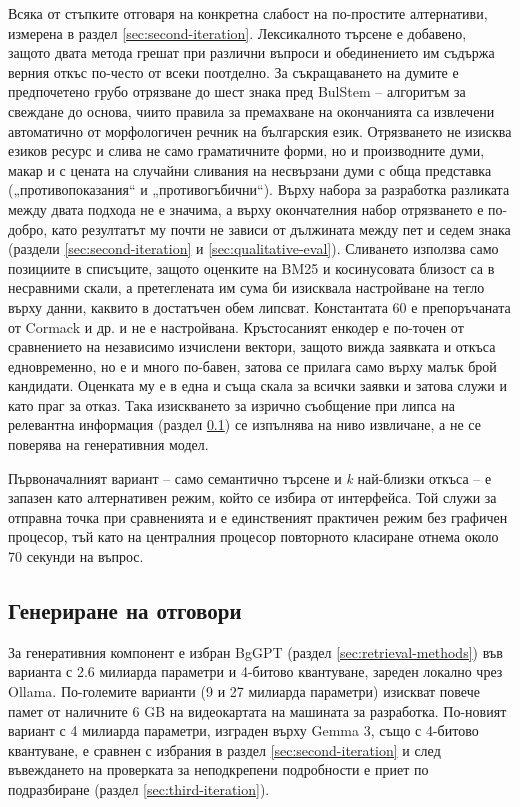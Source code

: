 \documentclass[12pt,a4paper]{article}
\begin{document}
Всяка от стъпките отговаря на конкретна слабост на по-простите алтернативи, измерена в раздел \ref{sec:second-iteration}. Лексикалното търсене е добавено, защото двата метода грешат при различни въпроси и обединението им съдържа верния откъс по-често от всеки поотделно. За съкращаването на думите е предпочетено грубо отрязване до шест знака пред BulStem \cite{nakov2003bulstem} -- алгоритъм за свеждане до основа, чиито правила за премахване на окончанията са извлечени автоматично от морфологичен речник на българския език. Отрязването не изисква езиков ресурс и слива не само граматичните форми, но и производните думи, макар и с цената на случайни сливания на несвързани думи с обща представка („противопоказания“ и „противогъбични“). Върху набора за разработка разликата между двата подхода не е значима, а върху окончателния набор отрязването е по-добро, като резултатът му почти не зависи от дължината между пет и седем знака (раздели \ref{sec:second-iteration} и \ref{sec:qualitative-eval}). Сливането използва само позициите в списъците, защото оценките на BM25 и косинусовата близост са в несравними скали, а претеглената им сума би изисквала настройване на тегло върху данни, каквито в достатъчен обем липсват. Константата 60 е препоръчаната от Cormack и др. и не е настройвана. Кръстосаният енкодер е по-точен от сравнението на независимо изчислени вектори, защото вижда заявката и откъса едновременно, но е и много по-бавен, затова се прилага само върху малък брой кандидати. Оценката му е в една и съща скала за всички заявки и затова служи и като праг за отказ. Така изискването за изрично съобщение при липса на релевантна информация (раздел \ref{sec:generation}) се изпълнява на ниво извличане, а не се поверява на генеративния модел.

Първоначалният вариант -- само семантично търсене и \textit{k} най-близки откъса -- е запазен като алтернативен режим, който се избира от интерфейса. Той служи за отправна точка при сравненията и е единственият практичен режим без графичен процесор, тъй като на централния процесор повторното класиране отнема около 70 секунди на въпрос.

\subsection{Генериране на отговори}
\label{sec:generation}
За генеративния компонент е избран BgGPT (раздел \ref{sec:retrieval-methods}) във варианта с 2.6 милиарда параметри и 4-битово квантуване, зареден локално чрез Ollama. По-големите варианти (9 и 27 милиарда параметри) изискват повече памет от наличните 6 GB на видеокартата на машината за разработка. По-новият вариант с 4 милиарда параметри, изграден върху Gemma 3, също с 4-битово квантуване, е сравнен с избрания в раздел \ref{sec:second-iteration} и след въвеждането на проверката за неподкрепени подробности е приет по подразбиране (раздел \ref{sec:third-iteration}).
\end{document}
